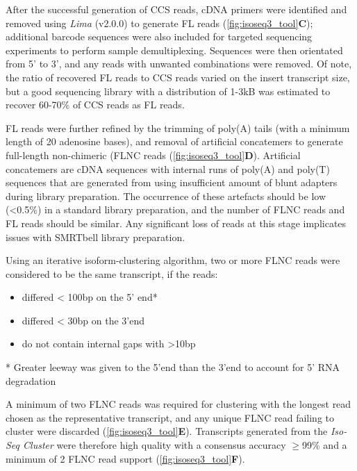 After the successful generation of CCS reads, cDNA primers were identified and removed using \textit{Lima} (v2.0.0) to generate FL reads (\cref{fig:isoseq3_tool}\textbf{C}); additional barcode sequences were also included for targeted sequencing experiments to perform sample demultiplexing. Sequences were then orientated from 5’ to 3’, and any reads with unwanted combinations were removed. Of note, the ratio of recovered FL reads to CCS reads varied on the insert transcript size, but a good sequencing library with a distribution of 1-3kB was estimated to recover 60-70\% of CCS reads as FL reads.   

FL reads were further refined by the trimming of poly(A) tails (with a minimum length of 20 adenosine bases), and removal of artificial concatemers to generate full-length non-chimeric (FLNC reads (\cref{fig:isoseq3_tool}\textbf{D}). Artificial concatemers are cDNA sequences with internal runs of poly(A) and poly(T) sequences that are generated from using insufficient amount of blunt adapters during library preparation. The occurrence of these artefacts should be low (<0.5\%) in a standard library preparation, and the number of FLNC reads and FL reads should be similar. Any significant loss of reads at this stage implicates issues with SMRTbell library preparation.

Using an iterative isoform-clustering algorithm, two or more FLNC reads were considered to be the same transcript, if the reads: 
\begin{itemize}
	\item differed < 100bp on the 5’ end* 
	\item differed < 30bp on the 3’end 
	\item do not contain internal gaps with >10bp
\end{itemize}
* Greater leeway was given to the 5'end than the 3'end to account for 5' RNA degradation

A minimum of two FLNC reads was required for clustering with the longest read chosen as the representative transcript, and any unique FLNC read failing to cluster were discarded (\cref{fig:isoseq3_tool}\textbf{E}). Transcripts generated from the \textit{Iso-Seq Cluster} were therefore high quality with a consensus accuracy $\geq$99\% and a minimum of 2 FLNC read support (\cref{fig:isoseq3_tool}\textbf{F}). 

